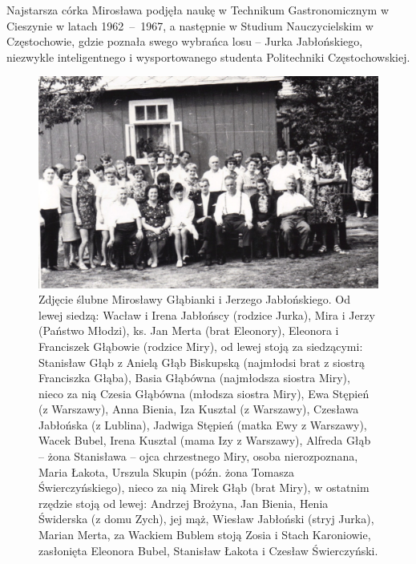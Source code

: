 Najstarsza córka Mirosława podjęła naukę w Technikum Gastronomicznym w Cieszynie w latach 1962~--~1967, a następnie w Studium Nauczycielskim w Częstochowie, gdzie poznała swego wybrańca losu -- Jurka Jabłońskiego, niezwykle inteligentnego i wysportowanego studenta Politechniki Częstochowskiej.

\begin{figure}[!hb]
\begin{center}
\includegraphics[width=\textwidth]{zdjecia/slub_jerzego_i_miroslawy_jablonskich_zbiorowe.jpg}
\caption[Zbiorowe zdjęcie ślubne Mirosławy i Jerzego Jabłońskich]{Zdjęcie ślubne Mirosławy Głąbianki i Jerzego Jabłońskiego. Od lewej siedzą: Wacław i Irena Jabłońscy (rodzice Jurka), Mira i Jerzy (Państwo Młodzi), ks. Jan Merta (brat Eleonory), Eleonora i Franciszek Głąbowie (rodzice Miry), od lewej stoją za siedzącymi: Stanisław Głąb z Anielą Głąb Biskupską (najmłodsi brat z siostrą Franciszka Głąba), Basia Głąbówna (najmłodsza siostra Miry), nieco za nią Czesia Głąbówna (młodsza siostra Miry), Ewa Stępień (z Warszawy), Anna Bienia, Iza Kusztal (z Warszawy), Czesława Jabłońska (z Lublina), Jadwiga Stępień (matka Ewy z Warszawy), Wacek Bubel, Irena Kusztal (mama Izy z Warszawy), Alfreda Głąb -- żona Stanisława -- ojca chrzestnego Miry, osoba nierozpoznana, Maria Łakota, Urszula Skupin (późn. żona Tomasza Świerczyńskiego), nieco za nią Mirek Głąb (brat Miry), w ostatnim rzędzie stoją od lewej: Andrzej Brożyna, Jan Bienia, Henia Świderska (z domu Zych), jej mąż, Wiesław Jabłoński (stryj Jurka), Marian Merta, za Wackiem Bublem stoją Zosia i Stach Karoniowie, zasłonięta Eleonora Bubel, Stanisław Łakota i Czesław Świerczyński.}
\label{rys:slub_jerzego_i_miroslawy_jablonskich_zbiorowe}
\end{center}
\end{figure}

